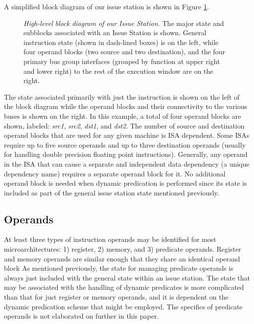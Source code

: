\documentclass[10pt,dvips]{article}
\begin{document}
A simplified block diagram of our issue station is shown in 
Figure \ref{fig:issuestation}.
%
\begin{figure}
\centering
\scriptsize {
}
\caption{{\em High-level block diagram of our Issue Station.} 
The major state and subblocks associated with an Issue Station is shown.
General instruction state (shown in dash-lined boxes) is
on the left, while
four operand blocks (two source and two destination),
and the four primary bus group interfaces (grouped by function at
upper right and lower right) to the rest of the
execution window are on the right.}
\label{fig:issuestation}
\end{figure}
%
The state associated primarily with just the instruction is
shown on the left of the block diagram while the operand blocks
and their connectivity to the various buses is shown on the
right.  
In this example, a total of four operand blocks are shown, labeled:
\textit{src1}, 
\textit{src2}, 
\textit{dst1}, 
and \textit{dst2}.
The number of source and destination operand blocks that are
used for any given machine is ISA dependent.
Some ISAs require up to five source operands and up to three destination
operands (usually for handling double precision floating point 
instructions).
Generally, any operand in the ISA that can cause a separate
and independent data dependency (a unique dependency name)
requires a separate operand block for it.
No additional operand block is needed when dynamic predication
is performed since its state is included as
part of the general issue station state mentioned previously.
%
%
\subsection{Operands}
%
At least three types of instruction operands may be identified
for most microarchitectures: 
1) register, 2) memory, and 3) predicate operands.
Register and memory operands are similar enough that
they share an identical operand block
As mentioned previously, the state for managing predicate
operands is always just included with the general state within
an issue station.
The state that may be associated with the handling of
dynamic predicates is more complicated than that for
just register or memory operands, and it is dependent
on the dynamic predication scheme that might be employed.
The specifics of predicate operands is not elaborated on
further in this paper.
\end{document}
